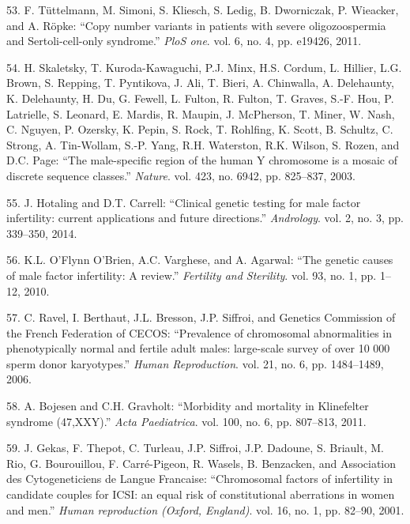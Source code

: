 \documentclass[12pt,a4paper,twoside]{ugathesis}
\theoremstyle{definition}
\theoremstyle{definition}
\theoremstyle{definition}
\theoremstyle{remark}
\begin{document}
\hypertarget{ref-Tuttelmann2011}{}
53. F. Tüttelmann, M. Simoni, S. Kliesch, S. Ledig, B. Dworniczak, P.
Wieacker, and A. Röpke: ``Copy number variants in patients with severe
oligozoospermia and Sertoli-cell-only syndrome.'' \emph{PloS one}. vol.
6, no. 4, pp. e19426, 2011.

\hypertarget{ref-Skaletsky2003}{}
54. H. Skaletsky, T. Kuroda-Kawaguchi, P.J. Minx, H.S. Cordum, L.
Hillier, L.G. Brown, S. Repping, T. Pyntikova, J. Ali, T. Bieri, A.
Chinwalla, A. Delehaunty, K. Delehaunty, H. Du, G. Fewell, L. Fulton, R.
Fulton, T. Graves, S.-F. Hou, P. Latrielle, S. Leonard, E. Mardis, R.
Maupin, J. McPherson, T. Miner, W. Nash, C. Nguyen, P. Ozersky, K.
Pepin, S. Rock, T. Rohlfing, K. Scott, B. Schultz, C. Strong, A.
Tin-Wollam, S.-P. Yang, R.H. Waterston, R.K. Wilson, S. Rozen, and D.C.
Page: ``The male-specific region of the human Y chromosome is a mosaic
of discrete sequence classes.'' \emph{Nature}. vol. 423, no. 6942, pp.
825--837, 2003.

\hypertarget{ref-Hotaling2014}{}
55. J. Hotaling and D.T. Carrell: ``Clinical genetic testing for male
factor infertility: current applications and future directions.''
\emph{Andrology}. vol. 2, no. 3, pp. 339--350, 2014.

\hypertarget{ref-OFlynnOBrien2010}{}
56. K.L. O'Flynn O'Brien, A.C. Varghese, and A. Agarwal: ``The genetic
causes of male factor infertility: A review.'' \emph{Fertility and
Sterility}. vol. 93, no. 1, pp. 1--12, 2010.

\hypertarget{ref-Ravel2006}{}
57. C. Ravel, I. Berthaut, J.L. Bresson, J.P. Siffroi, and Genetics
Commission of the French Federation of CECOS: ``Prevalence of
chromosomal abnormalities in phenotypically normal and fertile adult
males: large-scale survey of over 10 000 sperm donor karyotypes.''
\emph{Human Reproduction}. vol. 21, no. 6, pp. 1484--1489, 2006.

\hypertarget{ref-Bojesen2011}{}
58. A. Bojesen and C.H. Gravholt: ``Morbidity and mortality in
Klinefelter syndrome (47,XXY).'' \emph{Acta Paediatrica}. vol. 100, no.
6, pp. 807--813, 2011.

\hypertarget{ref-Gekas2001}{}
59. J. Gekas, F. Thepot, C. Turleau, J.P. Siffroi, J.P. Dadoune, S.
Briault, M. Rio, G. Bourouillou, F. Carré-Pigeon, R. Wasels, B.
Benzacken, and Association des Cytogeneticiens de Langue Francaise:
``Chromosomal factors of infertility in candidate couples for ICSI: an
equal risk of constitutional aberrations in women and men.'' \emph{Human
reproduction (Oxford, England)}. vol. 16, no. 1, pp. 82--90, 2001.
\end{document}
